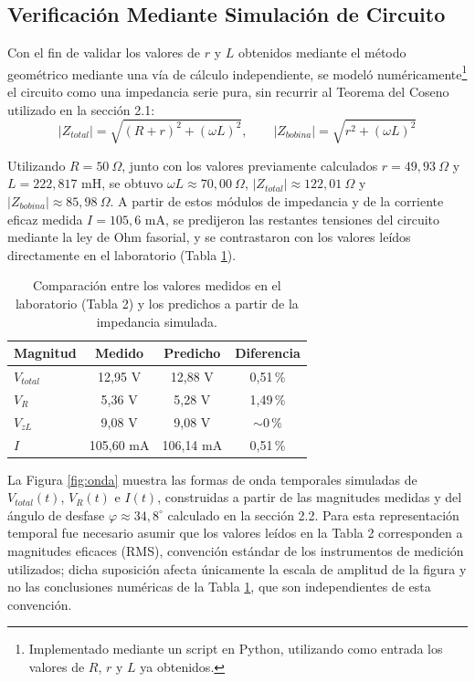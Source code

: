 
\subsection{Verificación Mediante Simulación de Circuito}

Con el fin de validar los valores de $r$ y $L$ obtenidos mediante el método geométrico mediante una vía de cálculo independiente, se modeló numéricamente\footnote{Implementado mediante un script en Python, utilizando como entrada los valores de $R$, $r$ y $L$ ya obtenidos.} el circuito como una impedancia serie pura, sin recurrir al Teorema del Coseno utilizado en la sección 2.1:
\begin{equation}
|Z_{total}| = \sqrt{(R+r)^2 + (\omega L)^2}, \qquad |Z_{bobina}| = \sqrt{r^2 + (\omega L)^2}
\label{eq:zsim}
\end{equation}

Utilizando $R = 50\ \Omega$, junto con los valores previamente calculados $r = 49{,}93\ \Omega$ y $L = 222{,}817$ mH, se obtuvo $\omega L \approx 70{,}00\ \Omega$, $|Z_{total}| \approx 122{,}01\ \Omega$ y $|Z_{bobina}| \approx 85{,}98\ \Omega$. A partir de estos módulos de impedancia y de la corriente eficaz medida $I = 105{,}6$ mA, se predijeron las restantes tensiones del circuito mediante la ley de Ohm fasorial, y se contrastaron con los valores leídos directamente en el laboratorio (Tabla \ref{tab:sim}).

\begin{table}[h]
\centering
\caption{Comparación entre los valores medidos en el laboratorio (Tabla 2) y los predichos a partir de la impedancia simulada.}
\label{tab:sim}
\begin{tabular}{lccc}
\toprule
Magnitud & Medido & Predicho & Diferencia \\
\midrule
$V_{total}$ & 12{,}95 V & 12{,}88 V & 0{,}51\,\% \\
$V_R$ & 5{,}36 V & 5{,}28 V & 1{,}49\,\% \\
$V_{zL}$ & 9{,}08 V & 9{,}08 V & $\sim$0\,\% \\
$I$ & 105{,}60 mA & 106{,}14 mA & 0{,}51\,\% \\
\bottomrule
\end{tabular}
\end{table}

La Figura \ref{fig:onda} muestra las formas de onda temporales simuladas de $V_{total}(t)$, $V_R(t)$ e $I(t)$, construidas a partir de las magnitudes medidas y del ángulo de desfase $\varphi \approx 34{,}8^\circ$ calculado en la sección 2.2. Para esta representación temporal fue necesario asumir que los valores leídos en la Tabla 2 corresponden a magnitudes eficaces (RMS), convención estándar de los instrumentos de medición utilizados; dicha suposición afecta únicamente la escala de amplitud de la figura y no las conclusiones numéricas de la Tabla \ref{tab:sim}, que son independientes de esta convención.

